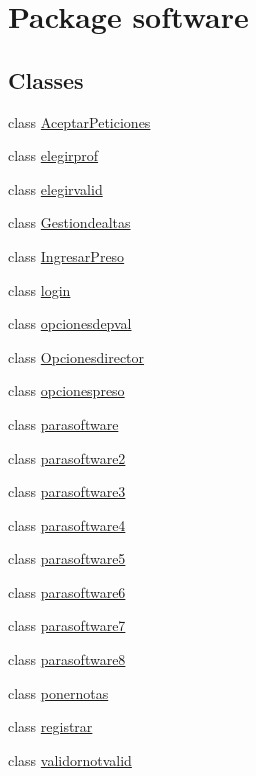 \hypertarget{namespacesoftware}{}\section{Package software}
\label{namespacesoftware}
\subsection*{Classes}
\begin{DoxyCompactItemize}
\item 
class \mbox{\hyperlink{classsoftware_1_1_aceptar_peticiones}{Aceptar\+Peticiones}}
\item 
class \mbox{\hyperlink{classsoftware_1_1elegirprof}{elegirprof}}
\item 
class \mbox{\hyperlink{classsoftware_1_1elegirvalid}{elegirvalid}}
\item 
class \mbox{\hyperlink{classsoftware_1_1_gestiondealtas}{Gestiondealtas}}
\item 
class \mbox{\hyperlink{classsoftware_1_1_ingresar_preso}{Ingresar\+Preso}}
\item 
class \mbox{\hyperlink{classsoftware_1_1login}{login}}
\item 
class \mbox{\hyperlink{classsoftware_1_1opcionesdepval}{opcionesdepval}}
\item 
class \mbox{\hyperlink{classsoftware_1_1_opcionesdirector}{Opcionesdirector}}
\item 
class \mbox{\hyperlink{classsoftware_1_1opcionespreso}{opcionespreso}}
\item 
class \mbox{\hyperlink{classsoftware_1_1parasoftware}{parasoftware}}
\item 
class \mbox{\hyperlink{classsoftware_1_1parasoftware2}{parasoftware2}}
\item 
class \mbox{\hyperlink{classsoftware_1_1parasoftware3}{parasoftware3}}
\item 
class \mbox{\hyperlink{classsoftware_1_1parasoftware4}{parasoftware4}}
\item 
class \mbox{\hyperlink{classsoftware_1_1parasoftware5}{parasoftware5}}
\item 
class \mbox{\hyperlink{classsoftware_1_1parasoftware6}{parasoftware6}}
\item 
class \mbox{\hyperlink{classsoftware_1_1parasoftware7}{parasoftware7}}
\item 
class \mbox{\hyperlink{classsoftware_1_1parasoftware8}{parasoftware8}}
\item 
class \mbox{\hyperlink{classsoftware_1_1ponernotas}{ponernotas}}
\item 
class \mbox{\hyperlink{classsoftware_1_1registrar}{registrar}}
\item 
class \mbox{\hyperlink{classsoftware_1_1validornotvalid}{validornotvalid}}
\end{DoxyCompactItemize}
